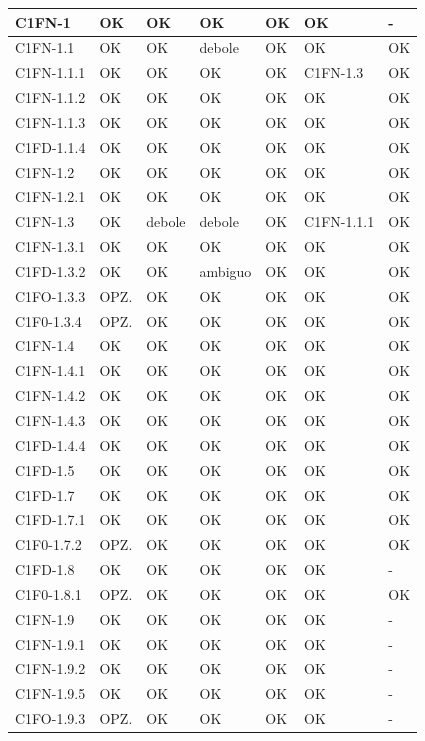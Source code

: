 \begin{footnotesize}
\begin{longtable}{|p{}|p{}|p{}|p{}|p{}|p{}|p{}|}
 C1FN-1& OK&  OK&  OK&  OK&  OK& -\\ \hline
 C1FN-1.1&  OK&  OK&  debole&  OK&  OK& OK\\ \hline
 C1FN-1.1.1&  OK&  OK&  OK&  OK&  C1FN-1.3& OK\\ \hline
 C1FN-1.1.2&  OK&  OK&  OK&  OK&  OK& OK\\ \hline
 C1FN-1.1.3&  OK&  OK&  OK&  OK&  OK& OK\\ \hline
 C1FD-1.1.4&  OK&  OK&  OK&  OK&  OK& OK\\ \hline
 C1FN-1.2&  OK&  OK&  OK&  OK&  OK& OK\\ \hline
 C1FN-1.2.1&  OK&  OK&  OK&  OK&  OK& OK\\ \hline
 C1FN-1.3&  OK&  debole&  debole&  OK&  C1FN-1.1.1& OK\\ \hline
 C1FN-1.3.1&  OK&  OK&  OK&  OK&  OK& OK\\ \hline
 C1FD-1.3.2& OK&  OK&  ambiguo&  OK&  OK& OK\\ \hline
 C1FO-1.3.3&  OPZ.&  OK&  OK&  OK&  OK& OK\\ \hline
 C1F0-1.3.4&  OPZ.&  OK&  OK&  OK&  OK& OK\\ \hline
 C1FN-1.4&  OK&  OK&  OK&  OK&  OK& OK\\ \hline
 C1FN-1.4.1&  OK&  OK&  OK&  OK&  OK& OK\\ \hline
 C1FN-1.4.2&  OK&  OK&  OK&  OK&  OK& OK\\ \hline
 C1FN-1.4.3&  OK&  OK&  OK&  OK&  OK& OK\\ \hline
 C1FD-1.4.4&  OK&  OK&  OK&  OK&  OK& OK\\ \hline
 C1FD-1.5&  OK&  OK&  OK&  OK&  OK& OK\\ \hline
 C1FD-1.7&  OK&  OK&  OK&  OK&  OK& OK\\ \hline
 C1FD-1.7.1&  OK&  OK&  OK&  OK&  OK& OK\\ \hline
 C1F0-1.7.2&  OPZ.&  OK&  OK&  OK&  OK& OK\\ \hline
 C1FD-1.8&  OK&  OK&  OK&  OK&  OK& -\\ \hline
 C1F0-1.8.1&  OPZ.&  OK&  OK&  OK&  OK& OK\\ \hline
 C1FN-1.9&  OK&  OK&  OK&  OK&  OK& -\\ \hline
 C1FN-1.9.1&  OK&  OK&  OK&  OK&  OK& -\\ \hline
 C1FN-1.9.2&  OK&  OK&  OK&  OK&  OK& -\\ \hline
 C1FN-1.9.5&  OK&  OK&  OK&  OK&  OK& -\\ \hline
 C1FO-1.9.3&  OPZ.&  OK&  OK&  OK&  OK& -\\ \hline

\end{longtable}
\end{footnotesize}
